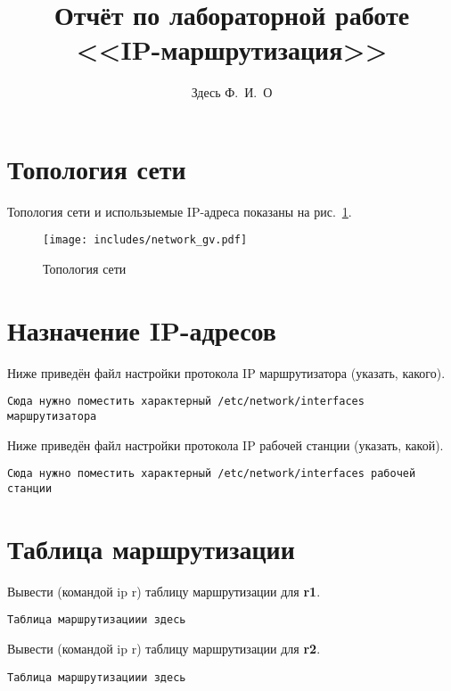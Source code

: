 \documentclass[a4paper,12pt]{article}
\title{Отчёт по лабораторной работе \\ <<IP-маршрутизация>>}
\author{Здесь Ф.~И.~О}
\begin{document}
\maketitle

\tableofcontents


\section{Топология сети}

Топология сети и использыемые IP-адреса показаны на рис.~\ref{fig:network}.

\begin{figure}
\centering
\texttt{[image: includes/network\_gv.pdf]}
\caption{Топология сети}
\label{fig:network}
\end{figure}


\section{Назначение IP-адресов}

Ниже приведён файл настройки протокола IP маршрутизатора (указать, какого).

\begin{Verbatim}
Сюда нужно поместить характерный /etc/network/interfaces маршрутизатора
\end{Verbatim}

Ниже приведён файл настройки протокола IP рабочей станции (указать, какой).

\begin{Verbatim}
Сюда нужно поместить характерный /etc/network/interfaces рабочей станции
\end{Verbatim}


\section{Таблица маршрутизации}

Вывести (командой ip r) таблицу маршрутизации для \textbf{r1}.

\begin{Verbatim}
Таблица маршрутизациии здесь
\end{Verbatim}

Вывести (командой ip r) таблицу маршрутизации для \textbf{r2}.

\begin{Verbatim}
Таблица маршрутизациии здесь
\end{Verbatim}
\end{document}
